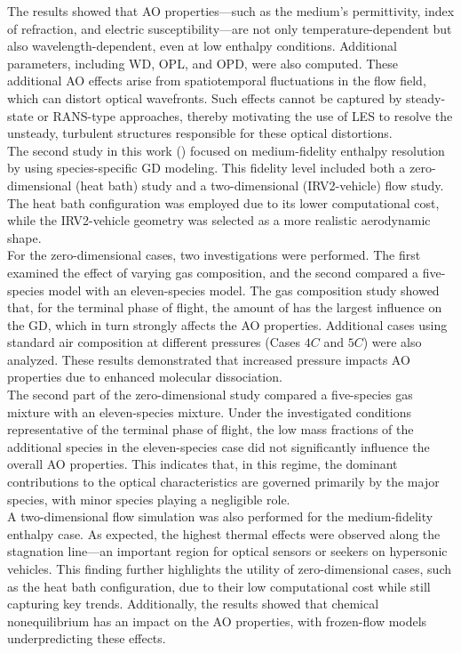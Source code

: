 The results showed that \gls{AO} properties—such as the medium’s permittivity,
index of refraction, and electric susceptibility—are not only
temperature-dependent but also wavelength-dependent, even at low enthalpy
conditions. Additional parameters, including \gls{WD}, \gls{OPL}, and \gls{OPD}, were also
computed. These additional \gls{AO} effects arise from spatiotemporal
fluctuations in the flow field, which can distort optical wavefronts. Such
effects cannot be captured by steady-state or \gls{RANS}-type approaches,
thereby motivating the use of \gls{LES} to resolve the unsteady, turbulent
structures responsible for these optical distortions. \\

The second study in this work () focused on
medium-fidelity enthalpy resolution by using species-specific \gls{GD}
modeling. This fidelity level included both a zero-dimensional (heat bath)
study and a two-dimensional (IRV2-vehicle) flow study. The heat bath
configuration was employed due to its lower computational cost, while the
IRV2-vehicle geometry was selected as a more realistic aerodynamic shape.\\

For the zero-dimensional cases, two investigations were performed. The first
examined the effect of varying gas composition, and the second compared a
five-species model with an eleven-species model. The gas composition study
showed that, for the terminal phase of flight, the amount of  has the
largest influence on the \gls{GD}, which in turn strongly affects the \gls{AO}
properties. Additional cases using standard air composition at different
pressures (Cases $4C$ and $5C$) were also analyzed. These results demonstrated
that increased pressure impacts \gls{AO} properties due to enhanced molecular
dissociation. \\

The second part of the zero-dimensional study compared a five-species gas mixture with an
eleven-species mixture. Under the investigated conditions representative of the
terminal phase of flight, the low mass fractions of the additional species in
the eleven-species case did not significantly influence the overall \gls{AO}
properties. This indicates that, in this regime, the dominant contributions to
the optical characteristics are governed primarily by the major species, with
minor species playing a negligible role.\\

A two-dimensional flow simulation was also performed for the medium-fidelity
enthalpy case. As expected, the highest thermal effects were observed along
the stagnation line—an important region for optical sensors or seekers on
hypersonic vehicles. This finding further highlights the utility of
zero-dimensional cases, such as the heat bath configuration, due to their low
computational cost while still capturing key trends. Additionally, the results
showed that chemical nonequilibrium has an impact on the \gls{AO}
properties, with frozen-flow models underpredicting these effects.\\

